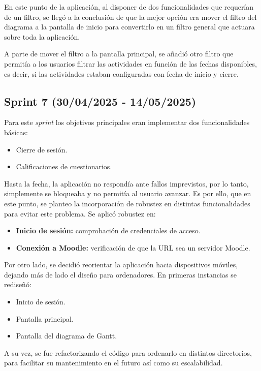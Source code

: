 En este punto de la aplicación, al disponer de dos funcionalidades que requerían de un filtro, se llegó a la conclusión de que la mejor opción era mover el filtro del diagrama a la pantalla de inicio para convertirlo en un filtro general que actuara sobre toda la aplicación.

A parte de mover el filtro a la pantalla principal, se añadió otro filtro que permitía a los usuarios filtrar las actividades en función de las fechas disponibles, es decir, si las actividades estaban configuradas con fecha de inicio y cierre.

\subsection{Sprint 7 (30/04/2025 - 14/05/2025)}
Para este \textit{sprint} los objetivos principales eran implementar dos funcionalidades básicas:
\begin{itemize}
    \item Cierre de sesión.
    \item Calificaciones de cuestionarios.
\end{itemize}

Hasta la fecha, la aplicación no respondía ante fallos imprevistos, por lo tanto, simplemente se bloqueaba y no permitía al usuario avanzar. Es por ello, que en este punto, se planteo la incorporación de robustez en distintas funcionalidades para evitar este problema. Se aplicó robustez en:
\begin{itemize}
    \item \textbf{Inicio de sesión:} comprobación de credenciales de acceso.
    \item \textbf{Conexión a Moodle:} verificación de que la URL sea un servidor Moodle.
\end{itemize}

Por otro lado, se decidió reorientar la aplicación hacia dispositivos móviles, dejando más de lado el diseño para ordenadores. En primeras instancias se rediseñó:
\begin{itemize}
    \item Inicio de sesión.
    \item Pantalla principal.
    \item Pantalla del diagrama de Gantt.
\end{itemize}

A su vez, se fue refactorizando el código para ordenarlo en distintos directorios, para facilitar su mantenimiento en el futuro así como su escalabilidad.


